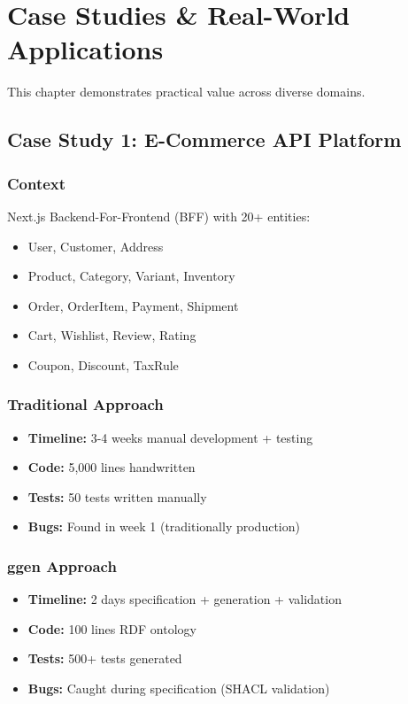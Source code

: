 \chapter{Case Studies \& Real-World Applications}

This chapter demonstrates practical value across diverse domains.

\section{Case Study 1: E-Commerce API Platform}

\subsection{Context}

Next.js Backend-For-Frontend (BFF) with 20+ entities:
\begin{itemize}
    \item User, Customer, Address
    \item Product, Category, Variant, Inventory
    \item Order, OrderItem, Payment, Shipment
    \item Cart, Wishlist, Review, Rating
    \item Coupon, Discount, TaxRule
\end{itemize}

\subsection{Traditional Approach}

\begin{itemize}
    \item \textbf{Timeline:} 3-4 weeks manual development + testing
    \item \textbf{Code:} 5,000 lines handwritten
    \item \textbf{Tests:} 50 tests written manually
    \item \textbf{Bugs:} Found in week 1 (traditionally production)
\end{itemize}

\subsection{ggen Approach}

\begin{itemize}
    \item \textbf{Timeline:} 2 days specification + generation + validation
    \item \textbf{Code:} 100 lines RDF ontology
    \item \textbf{Tests:} 500+ tests generated
    \item \textbf{Bugs:} Caught during specification (SHACL validation)
\end{itemize}

